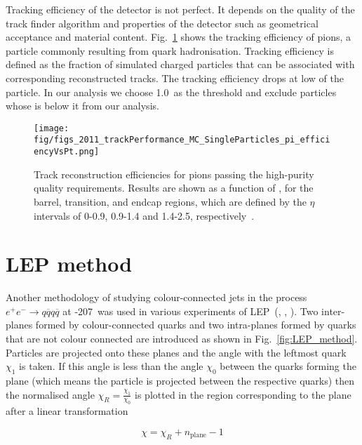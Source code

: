 Tracking efficiency of the detector is not perfect. It depends on the quality of the track finder algorithm and properties of the detector such as geometrical acceptance and material content. Fig.~\ref{fig:2011_trackPerformance_MC_SingleParticles_pi_efficiencyVsPt} shows the tracking efficiency of pions, a particle commonly resulting from quark hadronisation. Tracking efficiency is defined as the fraction of simulated charged particles that can be associated with corresponding reconstructed tracks. The tracking efficiency drops at low \pt of the particle. In our analysis we choose 1.0~\GeV as the threshold and exclude particles whose \pt is below it from our analysis.

\begin{figure}[hbtp]
    \texttt{[image: fig/figs\_2011\_trackPerformance\_MC\_SingleParticles\_pi\_efficiencyVsPt.png]}
    \caption{Track reconstruction efficiencies for pions passing the high-purity quality requirements. Results are shown as a function of \pt, for the barrel, transition, and endcap regions, which are defined by the $\eta$ intervals of 0-0.9, 0.9-1.4 and 1.4-2.5, respectively~\cite{Chatrchyan:2014fea}.}
    \label{fig:2011_trackPerformance_MC_SingleParticles_pi_efficiencyVsPt}
\end{figure}

\section{LEP method}

Another methodology of studying colour-connected jets in the process $e^{+}e^{-}\rightarrow q\overline{q}q\overline{q}$ at -207~\GeV was used in various experiments of LEP~(\cite{Abdallah:2006uq}, \cite{Abbiendi:2005es}, \cite{Achard:2003pe}). Two inter-\PW planes formed by colour-connected quarks and two intra-\PW planes formed by quarks that are not colour connected are introduced as shown in Fig.~\ref{fig:LEP_method}. Particles are projected onto these planes and the angle with the leftmost quark $\chi_{1}$ is taken. If this angle is less than the angle $\chi_{0}$ between the quarks forming the plane (which means the particle is projected between the respective quarks) then the normalised angle $\chi_{R}=\frac{\chi_{1}}{\chi_{0}}$ is plotted in the region corresponding to the plane after a linear transformation

\begin{equation}
  \chi=\chi_{R}+n_{\text{plane}}-1
\end{equation}

